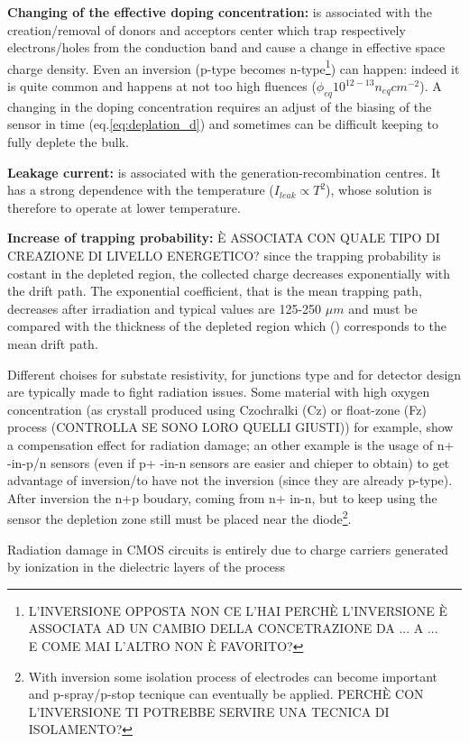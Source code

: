     \textbf{Changing of the effective doping concentration:} is associated with the creation/removal of donors and acceptors center which trap respectively electrons/holes from the conduction band and cause a change in effective space charge density. Even an inversion (p-type becomes n-type\footnote{L'INVERSIONE OPPOSTA NON CE L'HAI PERCHÈ L'INVERSIONE È ASSOCIATA AD UN CAMBIO DELLA CONCETRAZIONE DA ... A ...\\E COME MAI L'ALTRO NON È FAVORITO?}) can happen: indeed it is quite common and happens at not too high fluences ($\phi_{eq} 10^{12-13}n_{eq}cm^{-2}$). 
    A changing in the doping concentration requires an adjust of the biasing of the sensor in time (eq.\ref{eq:deplation_d}) and sometimes can be difficult keeping to fully deplete the bulk.

    \textbf{Leakage current:} is associated with the generation-recombination centres. It has a strong dependence with the temperature ($I_{leak}\propto T^2$), whose solution is therefore to operate at lower temperature.

    \textbf{Increase of trapping probability:}  È ASSOCIATA CON QUALE TIPO DI CREAZIONE DI LIVELLO ENERGETICO?
    since the trapping probability is costant in the depleted region, the collected charge decreases exponentially with the drift path. The exponential coefficient, that is the mean trapping path, decreases after irradiation and typical values are 125-250 $\mu m$ and must be compared with the thickness of the depleted region which () corresponds to the mean drift path.

    Different choises for substate resistivity, for junctions type and for detector design are typically made to fight radiation issues. Some material with high oxygen concentration (as crystall produced using Czochralki (Cz) or float-zone (Fz) process (CONTROLLA SE SONO LORO QUELLI GIUSTI)) for example, show a compensation effect for radiation damage; an other example is the usage of n+ -in-p/n sensors (even if p+ -in-n sensors are easier and chieper to obtain) to get advantage of inversion/to have not the inversion (since they are already p-type). After inversion the n+p boudary, coming from n+ in-n, but to keep using the sensor the depletion zone still must be placed near the diode\footnote{With inversion some isolation process of electrodes can become important and p-spray/p-stop tecnique can eventually be applied. PERCHÈ CON L'INVERSIONE TI POTREBBE SERVIRE UNA TECNICA DI ISOLAMENTO?}.
    
    
    Radiation damage in CMOS circuits is entirely due to charge
    carriers generated by ionization in the dielectric layers of the
    process